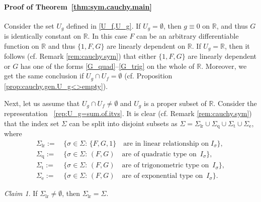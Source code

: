 \documentclass{birkjour}
\begin{document}
\paragraph{Proof of Theorem~\ref{thm:sym.cauchy.main}} Consider the set $U_g$ defined in \eqref{U_f,U_g}.
If 
$U_g=\emptyset$, then $g\equiv 0$ on ${{\mathbb R}}$, and thus $G$ is identically constant on ${{\mathbb R}}$. In this case $F$ can be an arbitrary differentiable function on ${{\mathbb R}}$ and thus $\{1, F, G\}$ are linearly dependent on ${{\mathbb R}}$. If $U_g={{\mathbb R}}$, then it follows (cf. Remark \ref{rem:cauchy.sym}) that either $\{1, F, G\}$ are linearly dependent
or $G$ has one of the forms \eqref{G_quad}--\eqref{G_trig} on the whole of ${{\mathbb R}}$. Moreover, we get the same conclusion if $U_g\cap U_f=\emptyset$ (cf. Proposition \ref{prop:cauchy.gen.U_g<>empty}). 

Next, let us assume that $U_g\cap U_f \neq \emptyset$ and $U_g$ is a proper subset of ${{\mathbb R}}$. Consider the representation ~\eqref{rep:U_g=sum.of.itvs}. It is clear (cf. Remark \ref{rem:cauchy.sym}) that the index set $\Sigma$ can be split into disjoint subsets as $\Sigma = \Sigma_{\textrm{lr}} \cup \Sigma_{\textrm{q}} \cup \Sigma_{\textrm{t}} \cup \Sigma_{\textrm{e}}$, where
\begin{align*}
\Sigma_{\textrm{lr}} :=& \, \bigl\{ \sigma\in\Sigma: \, \{F, G, 1\} \quad \text{are in linear relationship on} \; I_{\sigma} \bigr\},\\
\Sigma_{\textrm{q}} :=& \, \bigl\{\sigma\in\Sigma: \, (F, G) \quad \text{are of quadratic type on } \,I_{\sigma} \bigr\},\\
\Sigma_{\textrm{t}} :=& \, \bigl\{\sigma\in\Sigma: \, (F, G) \quad \text{are of trigonometric type on } \, I_{\sigma} \bigr\},\\
\Sigma_{\textrm{e}} :=& \, \bigl\{\sigma\in\Sigma: \, (F, G) \quad \text{are of exponential type on } \, I_{\sigma}\bigr\}.
\end{align*}

\smallskip
\noindent
\textit{Claim 1}. If $\Sigma_{\textrm{lr}} \neq \emptyset$, then $\Sigma_{\textrm{lr}} = \Sigma$.
\end{document}
